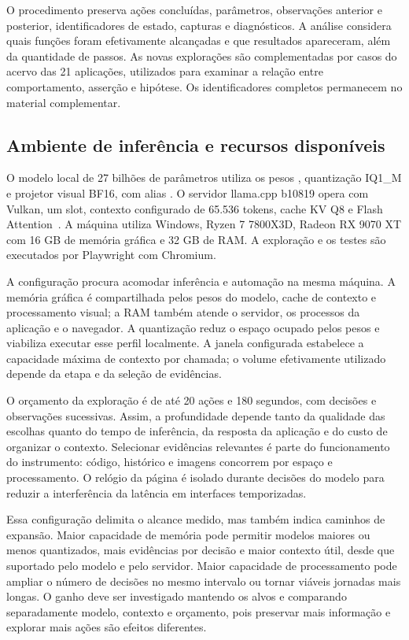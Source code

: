 \documentclass[12pt]{article}
\begin{document}
O procedimento preserva ações concluídas, parâmetros, observações anterior e posterior, identificadores de estado, capturas e diagnósticos. A análise considera quais funções foram efetivamente alcançadas e que resultados apareceram, além da quantidade de passos. As novas explorações são complementadas por casos do acervo das 21 aplicações, utilizados para examinar a relação entre comportamento, asserção e hipótese. Os identificadores completos permanecem no material complementar.

\subsection{Ambiente de inferência e recursos disponíveis}
O modelo local de 27 bilhões de parâmetros utiliza os pesos , quantização IQ1\_M e projetor visual BF16, com alias . O servidor llama.cpp b10819 opera com Vulkan, um slot, contexto configurado de 65.536 tokens, cache KV Q8 e Flash Attention~\cite{ggml2026llama}. A máquina utiliza Windows, Ryzen 7 7800X3D, Radeon RX 9070 XT com 16 GB de memória gráfica e 32 GB de RAM. A exploração e os testes são executados por Playwright com Chromium.

A configuração procura acomodar inferência e automação na mesma máquina. A memória gráfica é compartilhada pelos pesos do modelo, cache de contexto e processamento visual; a RAM também atende o servidor, os processos da aplicação e o navegador. A quantização reduz o espaço ocupado pelos pesos e viabiliza executar esse perfil localmente. A janela configurada estabelece a capacidade máxima de contexto por chamada; o volume efetivamente utilizado depende da etapa e da seleção de evidências.

O orçamento da exploração é de até 20 ações e 180 segundos, com decisões e observações sucessivas. Assim, a profundidade depende tanto da qualidade das escolhas quanto do tempo de inferência, da resposta da aplicação e do custo de organizar o contexto. Selecionar evidências relevantes é parte do funcionamento do instrumento: código, histórico e imagens concorrem por espaço e processamento. O relógio da página é isolado durante decisões do modelo para reduzir a interferência da latência em interfaces temporizadas.

Essa configuração delimita o alcance medido, mas também indica caminhos de expansão. Maior capacidade de memória pode permitir modelos maiores ou menos quantizados, mais evidências por decisão e maior contexto útil, desde que suportado pelo modelo e pelo servidor. Maior capacidade de processamento pode ampliar o número de decisões no mesmo intervalo ou tornar viáveis jornadas mais longas. O ganho deve ser investigado mantendo os alvos e comparando separadamente modelo, contexto e orçamento, pois preservar mais informação e explorar mais ações são efeitos diferentes.
\end{document}
